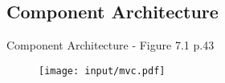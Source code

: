 \subsection{Component Architecture}
\begin{frame}{Component Architecture - Figure 7.1 p.43}


		\begin{figure}[p]%
		\texttt{[image: input/mvc.pdf]}%
		\end{figure}


\end{frame}
